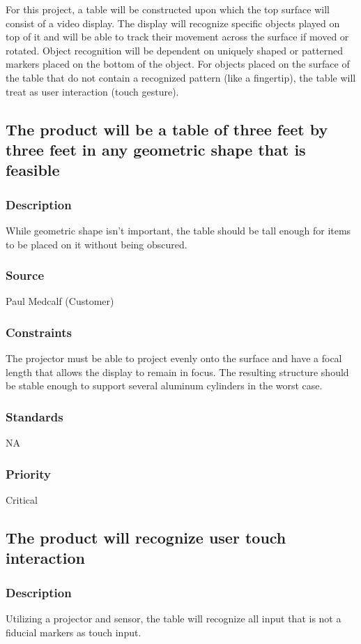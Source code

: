 For this project, a table will be constructed upon which the top surface will consist of a video display.
The display will recognize specific objects played on top of it and will be able to track their
movement across the surface if moved or rotated. Object recognition will be dependent on
uniquely shaped or patterned markers placed on the bottom of the object. For objects placed on
the surface of the table that do not contain a recognized pattern (like a fingertip), the table will
treat as user interaction (touch gesture).

\subsection{The product will be a table of three feet by three feet in any geometric shape that is feasible}
\subsubsection{Description}
While geometric shape isn't important, the table should be tall enough for items to be placed on it without being obscured. 
\subsubsection{Source}
Paul Medcalf (Customer)
\subsubsection{Constraints}
The projector must be able to project evenly onto the surface and have a focal length that allows the display to remain in focus. The resulting structure should be stable enough to support several aluminum cylinders in the worst case.
\subsubsection{Standards}
NA
\subsubsection{Priority}
Critical

\subsection{The product will recognize user touch interaction}
\subsubsection{Description}
Utilizing a projector and sensor, the table will recognize all input that is not a fiducial markers as touch input.
